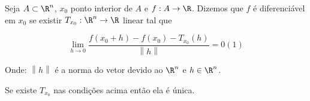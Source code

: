 \documentclass[11pt, oneside, a4paper]{gsm-l}
\begin{document}
\begin{defi}
    Seja $A \subset \R^n$, $x_0$ ponto interior de $A$ e $f:A \to \R$. Dizemos que $f$ é diferenciável em $x_0$ se existir $T_{x_0 } :\R^n  \to \R$ linear tal que

\[\boxed{
    \mathop {\lim }\limits_{h \to 0} \frac{{f\left( {x_0  + h} \right) - f\left( {x_0 } \right) - T_{x_0 } \left( h \right)}}{{\left\| h \right\|}} = 0} \left( 1 \right)
\]

    Onde: $\left\| h \right\|$ é a norma do vetor devido ao $\R^n$ e $h \in \R^n$.
\end{defi}

\newpage 

\begin{teo}
Se existe ${T_{x_0 } }$ nas condições acima então ela é \'unica.
\end{teo}
\end{document}
